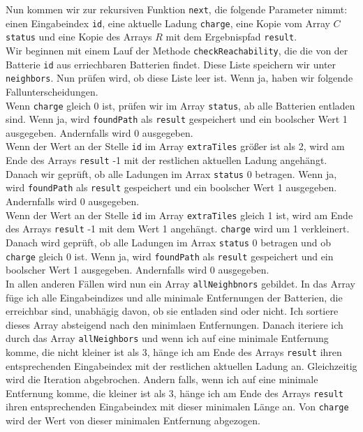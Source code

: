 \documentclass[a4paper,10pt,ngerman]{scrartcl}
\begin{document}
Nun kommen wir zur rekursiven Funktion \texttt{next}, die folgende Parameter nimmt: 
einen Eingabeindex \texttt{id}, eine aktuelle Ladung \texttt{charge}, eine Kopie vom Array $C$ \texttt{status} und eine Kopie des
Arrays $R$ mit dem Ergebnispfad \texttt{result}.\\
Wir beginnen mit einem Lauf der Methode \texttt{checkReachability}, die die von der Batterie \texttt{id} aus erriechbaren Batterien
findet. Diese Liste speichern wir unter \texttt{neighbors}. Nun prüfen wird, ob diese Liste leer ist.
Wenn ja, haben wir folgende Fallunterscheidungen.\\
Wenn \texttt{charge} gleich 0 ist, prüfen wir im Array \texttt{status}, ab alle Batterien entladen sind.
Wenn ja, wird \texttt{foundPath} als \texttt{result} gespeichert und ein boolscher Wert 1 ausgegeben. Andernfalls wird 0 ausgegeben.\\
Wenn der Wert an der Stelle \texttt{id} im Array \texttt{extraTiles} größer ist als 2, wird am Ende des Arrays \texttt{result}
-1 mit der restlichen aktuellen Ladung angehängt. Danach wir geprüft, ob alle Ladungen im Arrax \texttt{status} 0 betragen.
Wenn ja, wird \texttt{foundPath} als \texttt{result} gespeichert und ein boolscher Wert 1 ausgegeben. Andernfalls wird 0 ausgegeben.\\
Wenn der Wert an der Stelle \texttt{id} im Array \texttt{extraTiles} gleich 1 ist, wird am Ende des Arrays \texttt{result}
-1 mit dem Wert 1 angehängt. \texttt{charge} wird um 1 verkleinert. Danach wird geprüft, ob alle Ladungen im Arrax \texttt{status} 0 betragen
und ob \texttt{charge} gleich 0 ist.
Wenn ja, wird \texttt{foundPath} als \texttt{result} gespeichert und ein boolscher Wert 1 ausgegeben. Andernfalls wird 0 ausgegeben.\\
In allen anderen Fällen wird nun ein Array \texttt{allNeighbnors} gebildet. In das Array füge ich alle Eingabeindizes und alle
minimale Entfernungen der Batterien, die erreichbar sind, unabhägig davon, ob sie entladen sind oder nicht.
Ich sortiere dieses Array absteigend nach den minimlaen Entfernungen.
Danach iteriere ich durch das Array \texttt{allNeighbors} und wenn ich auf eine minimale Entfernung komme, die
nicht kleiner ist als 3, hänge ich am Ende des Arrays \texttt{result} ihren entsprechenden Eingabeindex mit der restlichen aktuellen Ladung an.
Gleichzeitig wird die Iteration abgebrochen.
Andern falls, wenn ich auf eine minimale Entfernung komme, die kleiner ist als 3, hänge ich am Ende des Arrays \texttt{result} ihren entsprechenden Eingabeindex mit dieser minimalen Länge an. Von \texttt{charge} wird der Wert von dieser minimalen Entfernung abgezogen.
\end{document}

